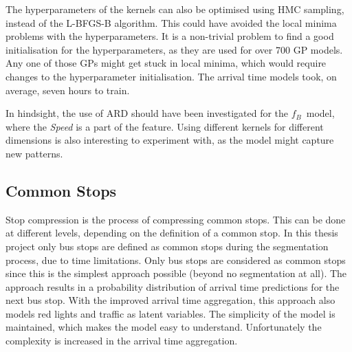 The hyperparameters of the kernels can also be optimised using HMC sampling, instead of the L-BFGS-B algorithm.
This could have avoided the local minima problems with the hyperparameters. 
It is a non-trivial problem to find a good initialisation for the hyperparameters, as they are used for over 700 GP models.
Any one of those GPs might get stuck in local minima, which would require changes to the hyperparameter initialisation.
The arrival time models took, on average, seven hours to train. 

In hindsight, the use of ARD should have been investigated for the $f_B$ model, where the \textit{Speed} is a part of the feature.
Using different kernels for different dimensions is also interesting to experiment with, as the model might capture new patterns.

\subsection{Common Stops}
Stop compression is the process of compressing common stops.
This can be done at different levels, depending on the definition of a common stop.
In this thesis project only bus stops are defined as common stops during the segmentation process, due to time limitations.
Only bus stops are considered as common stops since this is the simplest approach possible (beyond no segmentation at all).
The approach results in a probability distribution of arrival time predictions for the next bus stop.
With the improved arrival time aggregation, this approach also models red lights and traffic as latent variables.
The simplicity of the model is maintained, which makes the model easy to understand.
Unfortunately the complexity is increased in the arrival time aggregation.

